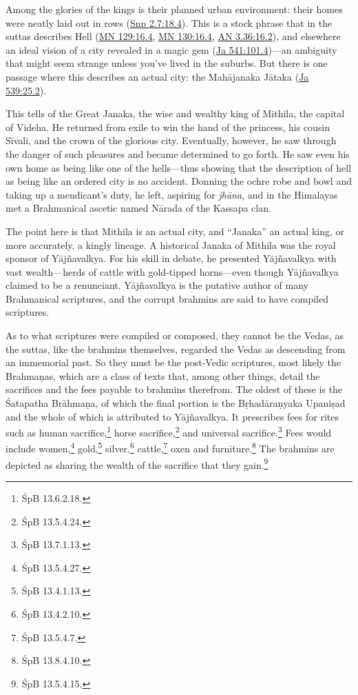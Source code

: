 \documentclass[12pt,openany]{book}%
\begin{document}
Among the glories of the kings is their planned urban environment: their homes were neatly laid out in rows (\href{https://suttacentral.net/snp2.7/en/sujato\#18.4}{Snp 2.7:18.4}). This is a stock phrase that in the suttas describes Hell (\href{https://suttacentral.net/mn129/en/sujato\#16.4}{MN 129:16.4}, \href{https://suttacentral.net/mn130/en/sujato\#16.4}{MN 130:16.4}, \href{https://suttacentral.net/an3.36/en/sujato\#16.2}{AN 3.36:16.2}), and elsewhere an ideal vision of a city revealed in a magic gem (\href{https://suttacentral.net/ja541}{Ja 541:101.4})—an ambiguity that might seem strange unless you’ve lived in the suburbs. But there is one passage where this describes an actual city: the \textsanskrit{Mahājanaka} \textsanskrit{Jātaka} (\href{https://suttacentral.net/ja539}{Ja 539:25.2}).

This tells of the Great Janaka, the wise and wealthy king of Mithila, the capital of Videha. He returned from exile to win the hand of the princess, his cousin \textsanskrit{Sīvali}, and the crown of the glorious city. Eventually, however, he saw through the danger of such pleasures and became determined to go forth. He saw even his own home as being like one of the hells—thus showing that the description of hell as being like an ordered city is no accident. Donning the ochre robe and bowl and taking up a mendicant’s duty, he left, aspiring for \textit{\textsanskrit{jhāna}}, and in the Himalayas met a Brahmanical ascetic named \textsanskrit{Nārada} of the Kassapa clan.

The point here is that Mithila is an actual city, and “Janaka” an actual king, or more accurately, a kingly lineage. A historical Janaka of Mithila was the royal sponsor of \textsanskrit{Yājñavalkya}. For his skill in debate, he presented \textsanskrit{Yājñavalkya} with vast wealth—herds of cattle with gold-tipped horns—even though \textsanskrit{Yājñavalkya} claimed to be a renunciant. \textsanskrit{Yājñavalkya} is the putative author of many Brahmanical scriptures, and the corrupt brahmins are said to have compiled scriptures.

As to what scriptures were compiled or composed, they cannot be the Vedas, as the suttas, like the brahmins themselves, regarded the Vedas as descending from an immemorial past. So they must be the post-Vedic scriptures, most likely the \textsanskrit{Brahmaṇas}, which are a class of texts that, among other things, detail the sacrifices and the fees payable to brahmins therefrom. The oldest of these is the Śatapatha \textsanskrit{Brāhmaṇa}, of which the final portion is the \textsanskrit{Bṛhadāraṇyaka} \textsanskrit{Upaniṣad} and the whole of which is attributed to \textsanskrit{Yājñavalkya}. It prescribes fees for rites such as human sacrifice,\footnote{ŚpB 13.6.2.18. } horse sacrifice,\footnote{ŚpB 13.5.4.24. } and universal sacrifice.\footnote{ŚpB 13.7.1.13. } Fees would include women,\footnote{ŚpB 13.5.4.27. } gold,\footnote{ŚpB 13.4.1.13. } silver,\footnote{ŚpB 13.4.2.10. } cattle,\footnote{ŚpB 13.5.4.7. } oxen and furniture.\footnote{ŚpB 13.8.4.10. } The brahmins are depicted as sharing the wealth of the sacrifice that they gain.\footnote{ŚpB 13.5.4.15. }
\end{document}
